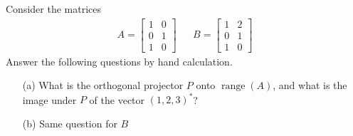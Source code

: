 \documentclass[10pt]{article}
\begin{document}
\begin{problem}[Exercise 6.4]
Consider the matrices
\begin{align*}
    A=\left[\begin{array}{cc}1 & 0\\0 & 1\\1 & 0\end{array}\right] && B=\left[\begin{array}{cc}1 & 2\\0 & 1\\1 & 0\end{array}\right]
\end{align*}
Answer the following questions by hand calculation.
\begin{enumerate}
    \item[(a)] What is the orthogonal projector \( P \) onto \( \operatorname{range}(A) \), and what is the image under \( P \) of the vector \( (1,2,3)^* \)?
    \item[(b)] Same question for \( B \)
\end{enumerate}
\end{problem}
\end{document}
